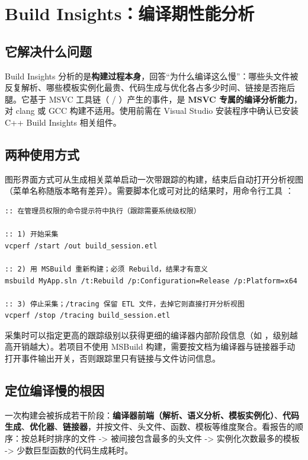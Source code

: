 \section{Build Insights：编译期性能分析}
\subsection{它解决什么问题}
Build Insights 分析的是\textbf{构建过程本身}，回答“为什么编译这么慢”：哪些头文件被反复解析、哪些模板实例化最贵、代码生成与优化各占多少时间、链接是否拖后腿。它基于 MSVC 工具链（ / ）产生的事件，是 \textbf{MSVC 专属的编译分析能力}，对 clang 或 GCC 构建不适用。使用前需在 Visual Studio 安装程序中确认已安装 C++ Build Insights 相关组件。

\subsection{两种使用方式}
图形界面方式可从生成相关菜单启动一次带跟踪的构建，结束后自动打开分析视图（菜单名称随版本略有差异）。需要脚本化或可对比的结果时，用命令行工具 ：

\begin{lstlisting}[style=shellstyle]
:: 在管理员权限的命令提示符中执行（跟踪需要系统级权限）

:: 1) 开始采集
vcperf /start /out build_session.etl

:: 2) 用 MSBuild 重新构建；必须 Rebuild，结果才有意义
msbuild MyApp.sln /t:Rebuild /p:Configuration=Release /p:Platform=x64

:: 3) 停止采集；/tracing 保留 ETL 文件，去掉它则直接打开分析视图
vcperf /stop /tracing build_session.etl
\end{lstlisting}

采集时可以指定更高的跟踪级别以获得更细的编译器内部阶段信息（如 ，级别越高开销越大）。若项目不使用 MSBuild 构建，需要按文档为编译器与链接器手动打开事件输出开关，否则跟踪里只有链接与文件访问信息。

\subsection{定位编译慢的根因}
一次构建会被拆成若干阶段：\textbf{编译器前端（解析、语义分析、模板实例化）}、\textbf{代码生成}、\textbf{优化器}、\textbf{链接器}，并按文件、头文件、函数、模板等维度聚合。看报告的顺序：按总耗时排序的文件 -> 被间接包含最多的头文件 -> 实例化次数最多的模板 -> 少数巨型函数的代码生成耗时。

